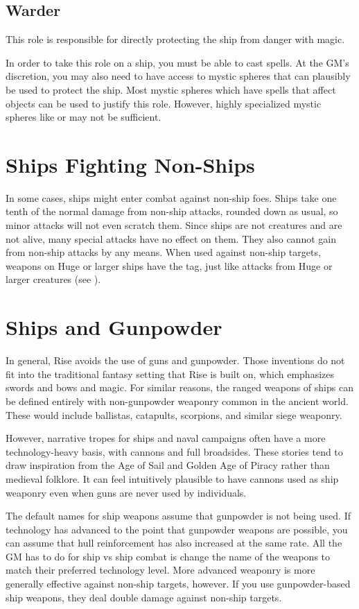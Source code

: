     \subsection{Warder}
        This role is responsible for directly protecting the ship from danger with magic.

        In order to take this role on a ship, you must be able to cast spells.
        At the GM's discretion, you may also need to have access to mystic spheres that can plausibly be used to protect the ship.
        Most mystic spheres which have spells that affect objects can be used to justify this role.
        However, highly specialized mystic spheres like  or  may not be sufficient.

\section{Ships Fighting Non-Ships}
    In some cases, ships might enter combat against non-ship foes.
    Ships take one tenth of the normal damage from non-ship attacks, rounded down as usual, so minor attacks will not even scratch them.
    Since ships are not creatures and are not alive, many special attacks have no effect on them.
    They also cannot gain  from non-ship attacks by any means.
    When used against non-ship targets, weapons on Huge or larger ships have the  tag, just like attacks from Huge or larger creatures (see ).

\section{Ships and Gunpowder}
    In general, Rise avoids the use of guns and gunpowder.
    Those inventions do not fit into the traditional fantasy setting that Rise is built on, which emphasizes swords and bows and magic.
    For similar reasons, the ranged weapons of ships can be defined entirely with non-gunpowder weaponry common in the ancient world.
    These would include ballistas, catapults, scorpions, and similar siege weaponry.

    However, narrative tropes for ships and naval campaigns often have a more technology-heavy basis, with cannons and full broadsides.
    These stories tend to draw inspiration from the Age of Sail and Golden Age of Piracy rather than medieval folklore.
    It can feel intuitively plausible to have cannons used as ship weaponry even when guns are never used by individuals.

    The default names for ship weapons assume that gunpowder is not being used.
    If technology has advanced to the point that gunpowder weapons are possible, you can assume that hull reinforcement has also increased at the same rate.
    All the GM has to do for ship vs ship combat is change the name of the weapons to match their preferred technology level.
    More advanced weaponry is more generally effective against non-ship targets, however.
    If you use gunpowder-based ship weapons, they deal double damage against non-ship targets.
